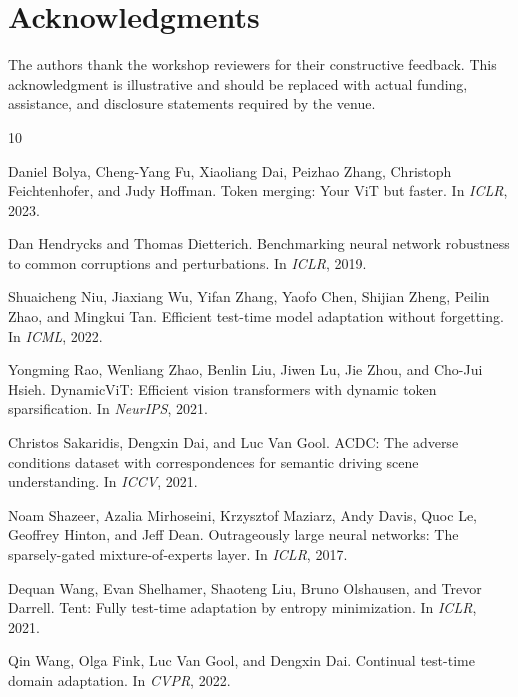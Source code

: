 \section*{Acknowledgments}

The authors thank the workshop reviewers for their constructive feedback.
This acknowledgment is illustrative and should be replaced with actual
funding, assistance, and disclosure statements required by the venue.

%   
%   
{\small
\begin{thebibliography}{10}

Daniel Bolya, Cheng-Yang Fu, Xiaoliang Dai, Peizhao Zhang, Christoph Feichtenhofer,
and Judy Hoffman.
\newblock Token merging: Your ViT but faster.
\newblock In \emph{ICLR}, 2023.

Dan Hendrycks and Thomas Dietterich.
\newblock Benchmarking neural network robustness to common corruptions and
perturbations.
\newblock In \emph{ICLR}, 2019.

Shuaicheng Niu, Jiaxiang Wu, Yifan Zhang, Yaofo Chen, Shijian Zheng, Peilin Zhao,
and Mingkui Tan.
\newblock Efficient test-time model adaptation without forgetting.
\newblock In \emph{ICML}, 2022.

Yongming Rao, Wenliang Zhao, Benlin Liu, Jiwen Lu, Jie Zhou, and Cho-Jui Hsieh.
\newblock DynamicViT: Efficient vision transformers with dynamic token sparsification.
\newblock In \emph{NeurIPS}, 2021.

Christos Sakaridis, Dengxin Dai, and Luc Van Gool.
\newblock ACDC: The adverse conditions dataset with correspondences for
semantic driving scene understanding.
\newblock In \emph{ICCV}, 2021.

Noam Shazeer, Azalia Mirhoseini, Krzysztof Maziarz, Andy Davis, Quoc Le,
Geoffrey Hinton, and Jeff Dean.
\newblock Outrageously large neural networks: The sparsely-gated
mixture-of-experts layer.
\newblock In \emph{ICLR}, 2017.

Dequan Wang, Evan Shelhamer, Shaoteng Liu, Bruno Olshausen, and Trevor Darrell.
\newblock Tent: Fully test-time adaptation by entropy minimization.
\newblock In \emph{ICLR}, 2021.

Qin Wang, Olga Fink, Luc Van Gool, and Dengxin Dai.
\newblock Continual test-time domain adaptation.
\newblock In \emph{CVPR}, 2022.

\end{thebibliography}
}
